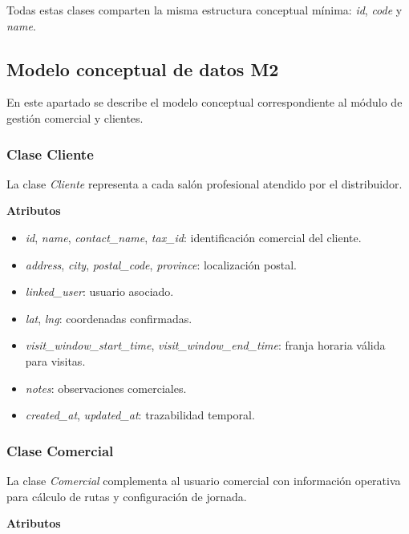 Todas estas clases comparten la misma estructura conceptual mínima: \textit{id}, \textit{code} y \textit{name}.

\subsection{Modelo conceptual de datos M2}

En este apartado se describe el modelo conceptual correspondiente al módulo de gestión comercial y clientes.

\subsubsection{Clase Cliente}

La clase \textit{Cliente} representa a cada salón profesional atendido por el distribuidor.

\textbf{Atributos}

\begin{itemize}
      \item \textit{id}, \textit{name}, \textit{contact\_name}, \textit{tax\_id}: identificación comercial del cliente.
      \item \textit{address}, \textit{city}, \textit{postal\_code}, \textit{province}: localización postal.
      \item \textit{linked\_user}: usuario asociado.
      \item \textit{lat}, \textit{lng}: coordenadas confirmadas.
      \item \textit{visit\_window\_start\_time}, \textit{visit\_window\_end\_time}: franja horaria válida para visitas.
      \item \textit{notes}: observaciones comerciales.
      \item \textit{created\_at}, \textit{updated\_at}: trazabilidad temporal.
\end{itemize}

\subsubsection{Clase Comercial}

La clase \textit{Comercial} complementa al usuario comercial con información operativa para cálculo de rutas y configuración de jornada.

\textbf{Atributos}

